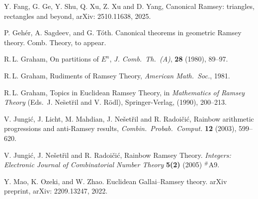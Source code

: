 \documentclass[a4paper, 11pt,reqno]{amsart}
\theoremstyle{definition}
\begin{document}
\begin{thebibliography}{}
 Y. Fang, G. Ge, Y. Shu, Q. Xu, Z. Xu and D. Yang, Canonical Ramsey: triangles, rectangles and beyond,
arXiv: 2510.11638, 2025.

 P. Geh\'er, A. Sagdeev, and G. T\'oth. Canonical theorems in geometric Ramsey theory. Comb.
Theory, to appear.

 R.\,L. Graham, On partitions of $E^n$, {\em J. Comb.\ Th.\ (A)}, {\bf 28} (1980), 89--97.

 R.\,L. Graham, Rudiments of Ramsey Theory, {\em American Math.\ Soc.}, 1981.


 R.\,L. Graham, Topics in Euclidean Ramsey Theory, in {\em Mathematics of
Ramsey Theory} (Eds.\ J. Ne\u{s}et\u{r}il and V. R\"odl), Springer-Verlag,
 (1990), 200--213.

  V. Jungi\'c,  J. Licht, M. Mahdian, J. Ne\v set\v ril and
R. Radoi\v ci\'c, Rainbow arithmetic progressions and anti-Ramsey results,
{\em Combin.\ Probab.\ Comput.} {\bf 12} (2003), 599--620.


 V. Jungi\'c, J. Ne\v set\v ril and R. Radoi\v ci\'c,
Rainbow Ramsey Theory. {\em Integers: Electronic Journal of
Combinatorial Number Theory} {\bf 5(2)} (2005) $^{\text{\#}}\!$A9.

 Y. Mao, K. Ozeki, and W. Zhao. Euclidean Gallai--Ramsey theory. arXiv preprint, arXiv:
2209.13247, 2022.


\end{thebibliography}
\end{document}
